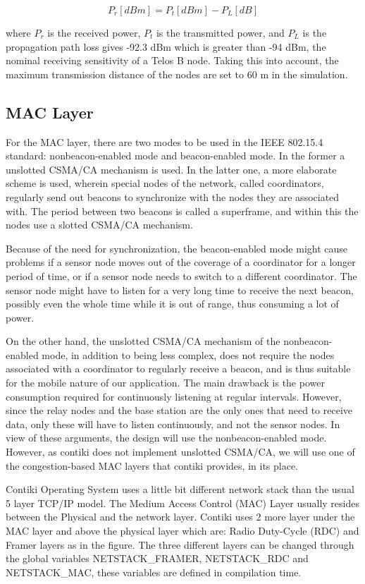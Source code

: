 \documentclass[conference]{IEEEtran}
\begin{document}
\begin{displaymath}
    P_{r}[dBm] = P_{t}[dBm] - P_{L}[dB]
\end{displaymath}

where $P_{r}$ is the received power, $P_{t}$ is the transmitted power, and
$P_{L}$ is the propagation path loss gives -92.3 dBm which is greater than -94
dBm, the nominal receiving sensitivity of a Telos B node. Taking this into
account, the maximum transmission distance of the nodes are set to 60 m in the
simulation.

\subsection{MAC Layer}

For the MAC layer, there are two modes to be used in the IEEE 802.15.4
standard: nonbeacon-enabled mode and beacon-enabled mode. In the former
a unslotted CSMA/CA mechanism is used. In the latter one, a more elaborate
scheme is used, wherein special nodes of the network, called coordinators,
regularly send out beacons to synchronize with the nodes they are associated
with. The period between two beacons is called a superframe, and within this
the nodes use a slotted CSMA/CA mechanism.

Because of the need for synchronization, the beacon-enabled mode might cause
problems if a sensor node moves out of the coverage of a coordinator for
a longer period of time, or if a sensor node needs to switch to a different
coordinator.  The sensor node might have to listen for a very long time to
receive the next beacon, possibly even the whole time while it is out of range,
thus consuming a lot of power.

On the other hand, the unslotted CSMA/CA mechanism of the nonbeacon-enabled
mode, in addition to being less complex, does not require the nodes associated
with a coordinator to regularly receive a beacon, and is thus suitable for the
mobile nature of our application. The main drawback is the power consumption
required for continuously listening at regular intervals.  However, since the
relay nodes and the base station are the only ones that need to receive data,
only these will have to listen continuously, and not the sensor nodes. In view
of these arguments, the design will use the nonbeacon-enabled mode. However, as
contiki does not implement unslotted CSMA/CA, we will use one of the
congestion-based MAC layers that contiki provides, in its place.

Contiki Operating System uses a little bit different network stack than the usual 
5 layer TCP/IP model. The Medium Access Control (MAC) Layer usually resides between 
the Physical and the network layer. Contiki uses 2 more layer under the MAC layer and 
above the physical layer which are: Radio Duty-Cycle (RDC) and Framer layers as in 
the figure. The three different layers can be changed through the global variables 
NETSTACK\_FRAMER, NETSTACK\_RDC and NETSTACK\_MAC, these variables are defined in compilation time.
\end{document}

